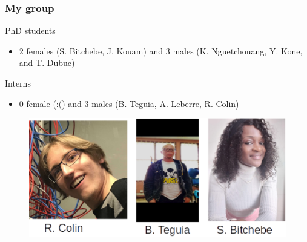 \documentclass[xcolor=table,bigger,unknownkeysallowed]{beamer}
\begin{document}
        \begin{frame}
        \frametitle{My group} 
			\begin{block}{PhD students}
				\begin{itemize}
					\item 2 females (S. Bitchebe, J. Kouam) and 3 males (K. Nguetchouang, Y. Kone, and T. Dubuc)
				\end{itemize}
			\end{block}
			\begin{block}{Interns}
				\begin{itemize}
					\item 0 female (:() and 3 males (B. Teguia, A. Leberre, R. Colin)
				\end{itemize}
			\end{block}	
 		    \begin{figure}
			\centering
	\includegraphics[width=.5\columnwidth]{fig/students}
			\end{figure}						
        \end{frame}
\end{document}
